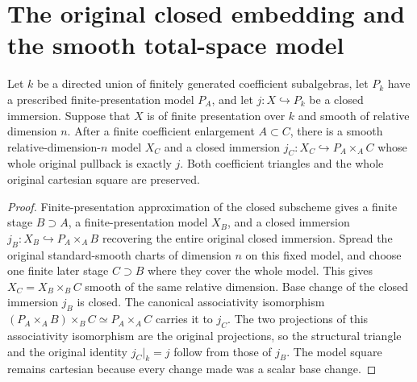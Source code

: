 \section{The original closed embedding and the smooth total-space model}

\begin{lemma}
\label{lem:kn-relative-arithmetic-smooth-closed-model}
\leanok
Let $k$ be a directed union of finitely generated coefficient
subalgebras, let $P_k$ have a prescribed finite-presentation model
$P_A$, and let $j:X\hookrightarrow P_k$ be a closed immersion.
Suppose that $X$ is of finite presentation over $k$ and smooth of
relative dimension $n$.  After a finite coefficient enlargement
$A\subset C$, there is a smooth relative-dimension-$n$ model $X_C$
and a closed immersion $j_C:X_C\hookrightarrow P_A\times_A C$
whose whole original pullback is exactly $j$.  Both coefficient
triangles and the whole original cartesian square are preserved.
\end{lemma}
\begin{proof}
Finite-presentation approximation of the closed subscheme gives a
finite stage $B\supset A$, a finite-presentation model $X_B$, and a
closed immersion $j_B:X_B\hookrightarrow P_A\times_A B$ recovering
the entire original closed immersion.  Spread the original
standard-smooth charts of dimension $n$ on this fixed model, and
choose one finite later stage $C\supset B$ where they cover the
whole model.  This gives $X_C=X_B\times_B C$ smooth of the same
relative dimension.  Base change of the closed immersion $j_B$ is
closed.  The canonical associativity isomorphism
$(P_A\times_A B)\times_B C\simeq P_A\times_A C$ carries it to
$j_C$.  The two projections of this associativity isomorphism are
the original projections, so the structural triangle and the
original identity $j_C|_k=j$ follow from those of $j_B$.  The model
square remains cartesian because every change made was a scalar
base change.
\end{proof}
